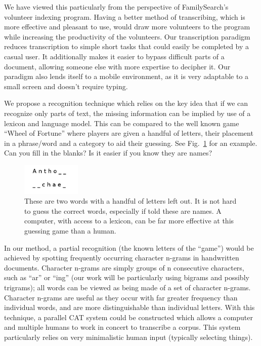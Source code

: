 \documentclass[ms]{byuprop}
\begin{document}
We have viewed this particularly from the perspective of FamilySearch's volunteer indexing program. Having a better method of transcribing, which is more effective and pleasant to use, would  draw more volunteers to the program while increasing the productivity of the volunteers. Our transcription paradigm reduces transcription to simple short tasks that could easily be completed by a casual user. It additionally makes it easier to bypass difficult parts of a document, allowing someone else with more expertise to decipher it. Our paradigm also lends itself to a mobile environment, as it is very adaptable to a small screen and doesn't require typing.


We propose a recognition technique which relies on the key idea that if we can recognize only parts of text, the missing information can be implied by use of a lexicon and language model. This can be compared to the well known game ``Wheel of Fortune'' where players are given a handful of letters, their placement in a phrase/word and a category to aid their guessing. See Fig.~\ref{fig:wheel_of_fortune_example} for an example. Can you fill in the blanks? Is it easier if you know they are names?

\begin{figure}
    \centering
    \includegraphics[width=0.25\textwidth]{wheel_of_fortune_example}
    \caption{These are two words with a handful of letters left out. It is not hard to guess the correct words, especially if told these are names. A computer, with access to a lexicon, can be far more effective at this guessing game than a human.}
    \label{fig:wheel_of_fortune_example}
\end{figure}

In our method, a partial recognition (the known letters of the ``game'') would be achieved by spotting frequently occurring character n-grams in handwritten documents. Character n-grams are simply groups of n consecutive characters, such as ``ar'' or ``ing'' (our work will be particularly using bigrams and possibly trigrams); all words can be viewed as being made of a set of character n-grams. Character n-grams are useful as they occur with far greater frequency than individual words, and are more distinguishable than individual letters. With this technique, a parallel CAT system could be constructed which allows a computer and multiple humans to work in concert to transcribe a corpus. This system particularly relies on very minimalistic human input (typically selecting things).
\end{document}
